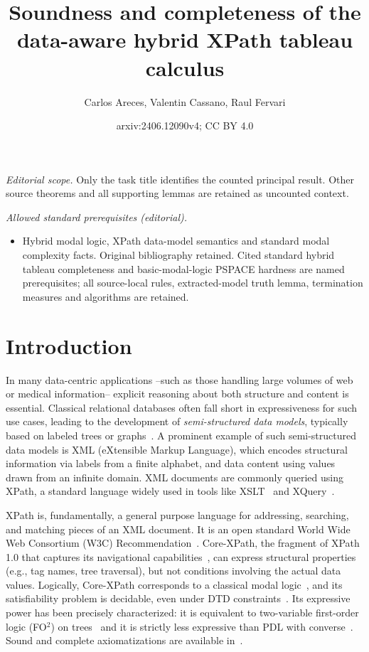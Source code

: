 \documentclass[10pt,a4paper]{amsart}
\title{Soundness and completeness of the data-aware hybrid XPath tableau calculus}
\author{Carlos Areces, Valentin Cassano, Raul Fervari}
\date{arxiv:2406.12090v4; CC BY 4.0}
\theoremstyle{definition}
\theoremstyle{remark}
\begin{document}
\maketitle
\noindent\textit{Editorial scope.} Only the task title identifies the counted principal result. Other source theorems and all supporting lemmas are retained as uncounted context.\par\medskip
\noindent\textit{Allowed standard prerequisites (editorial).}\begin{itemize}
\item Hybrid modal logic, XPath data-model semantics and standard modal complexity facts. Original bibliography retained. Cited standard hybrid tableau completeness and basic-modal-logic PSPACE hardness are named prerequisites; all source-local rules, extracted-model truth lemma, termination measures and algorithms are retained.
\end{itemize}\medskip
\section{Introduction}
\label{sec:intro}


In many data-centric applications --such as those handling large volumes of web or medical information-- explicit reasoning about both structure and content is essential. Classical relational databases often fall short in expressiveness for such use cases, leading to the development of \emph{semi-structured data models}, typically based on labeled trees or graphs~\cite{Bune:semi97,Abit:data99}. A prominent example of such semi-structured data models is XML (eXtensible Markup Language), which encodes structural information via labels from a finite alphabet, and data content using values drawn from an infinite domain. XML documents are commonly queried using XPath, a standard language widely used in tools like XSLT~\cite{xslt:w3c} and XQuery~\cite{xquery:w3c}.  

XPath is, fundamentally, a general purpose language for
addressing, searching, and matching pieces of an XML document. It is an open standard
World Wide Web Consortium (W3C) Recommendation~\cite{xpath:w3c}.
Core-XPath, the fragment of XPath 1.0 that captures its navigational capabilities~\cite{GKP05}, can express structural properties (e.g., tag names, tree traversal), but not conditions involving the actual data values. Logically, Core-XPath corresponds to a classical modal logic~\cite{blackburn2001modal,blackburn06}, and its satisfiability problem is decidable, even under DTD constraints~\cite{M04,BFG08}. Its expressive power has been precisely characterized: it is equivalent to two-variable first-order logic (FO$^2$) on trees~\cite{MdR05} and it is strictly less expressive than PDL with converse~\cite{BK08}. Sound and complete axiomatizations are available in~\cite{CateM09,cateLM10}.
\end{document}
